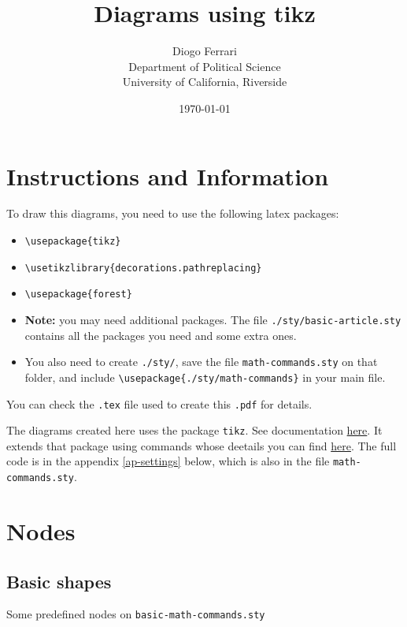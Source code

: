 \documentclass[a4paper]{article}
\author{Diogo Ferrari\\
Department of Political Science\\
University of California, Riverside\\
}
\date{\today}
\title{Diagrams using tikz}
\begin{document}
\maketitle
\tableofcontents

\pagebreak
\section{Instructions and Information}
\label{sec:orge628d2a}

To draw this diagrams, you need to use the following latex packages:
\begin{itemize}
\item \texttt{\textbackslash{}usepackage\{tikz\}}
\item \texttt{\textbackslash{}usetikzlibrary\{decorations.pathreplacing\}}
\item \texttt{\textbackslash{}usepackage\{forest\}}
\item \textbf{Note:} you may need additional packages. The file \texttt{./sty/basic-article.sty} contains all the packages you need and some extra ones.
\item You also need to create \texttt{./sty/}, save the file \texttt{math-commands.sty} on that folder, and include \texttt{\textbackslash{}usepackage\{./sty/math-commands\}} in your main file.
\end{itemize}

You can check the \texttt{.tex} file used to create this \texttt{.pdf} for details.

The diagrams created here uses the package \texttt{tikz}. See documentation \href{https://ctan.org/pkg/pgf?lang=en}{here}. It extends that package using commands whose deetails you can find \href{https://github.com/jluttine/tikz-bayesnet}{here}. The full code is in the appendix \ref{ap-settings} below, which is also in the file \texttt{math-commands.sty}.


\section{Nodes}
\label{sec:org0befa40}
\subsection{Basic shapes}
\label{sec:org32a261b}
Some predefined nodes on \texttt{basic-math-commands.sty}
\end{document}
